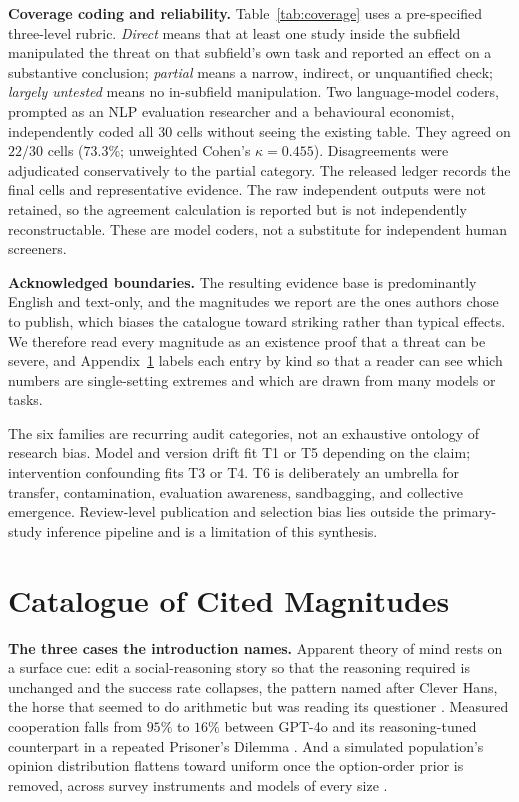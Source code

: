 \documentclass[11pt]{article}
\begin{document}
\textbf{Coverage coding and reliability.} Table~\ref{tab:coverage} uses a
pre-specified three-level rubric. \emph{Direct} means that at least one study
inside the subfield manipulated the threat on that subfield's own task and
reported an effect on a substantive conclusion; \emph{partial} means a narrow,
indirect, or unquantified check; \emph{largely untested} means no in-subfield
manipulation. Two language-model coders, prompted as an NLP evaluation researcher
and a behavioural economist, independently coded all $30$ cells without seeing
the existing table. They agreed on $22/30$ cells ($73.3\%$; unweighted Cohen's
$\kappa=0.455$). Disagreements were adjudicated conservatively to the partial
category. The released ledger records the final cells and representative
evidence. The raw independent outputs were not retained, so the agreement
calculation is reported but is not independently reconstructable. These are
model coders, not a substitute for independent human screeners.

\textbf{Acknowledged boundaries.} The resulting evidence base is predominantly
English and text-only, and the magnitudes we report are the ones authors
chose to publish, which biases the catalogue toward striking rather than
typical effects. We therefore read every magnitude as an existence proof that
a threat can be severe, and Appendix~\ref{app:catalogue} labels each entry by
kind so that a reader can see which numbers are single-setting extremes and
which are drawn from many models or tasks.

The six families are recurring audit categories, not an exhaustive ontology of
research bias. Model and version drift fit T1 or T5 depending on the claim;
intervention confounding fits T3 or T4. T6 is deliberately an umbrella for
transfer, contamination, evaluation awareness, sandbagging, and collective
emergence. Review-level publication and selection bias lies outside the
primary-study inference pipeline and is a limitation of this synthesis.

\section{Catalogue of Cited Magnitudes}
\label{app:catalogue}

\textbf{The three cases the introduction names.} Apparent theory of mind rests
on a surface cue: edit a social-reasoning story so that the reasoning required is
unchanged and the success rate collapses, the pattern named after Clever Hans, the
horse that seemed to do arithmetic but was reading its questioner
\cite{ullman2023trivial,shapira2024clever}. Measured cooperation falls from $95\%$
to $16\%$ between GPT-4o and its reasoning-tuned counterpart in a repeated
Prisoner's Dilemma \cite{li2025spontaneous}. And a simulated population's opinion
distribution flattens toward uniform once the option-order prior is removed, across
survey instruments and models of every size \cite{dominguez2024questioning}.
\end{document}

